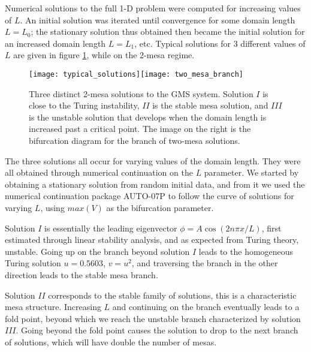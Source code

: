 
Numerical solutions to the full 1-D problem were computed for increasing values of $L$. An initial solution was iterated until convergence for some domain length $L=L_0$; the stationary solution thus obtained then became the initial solution for an increased domain length $L=L_1$, etc. Typical solutions for 3 different values of $L$ are given in figure \ref{fig:typical}, while on the 2-mesa regime. 
% 
\begin{figure}[htb]
\begin{center}
\texttt{[image: typical\_solutions]}\texttt{[image: two\_mesa\_branch]}

\caption{Three distinct 2-mesa solutions to the GMS system. Solution $I$ is close to the Turing instability, $II$ is the stable mesa solution, and $III$ is the unstable solution that develops when the domain length is increased past a critical point. The image on the right is the bifurcation diagram for the branch of two-mesa solutions.}
\label{fig:typical}
\end{center}
\end{figure}
% 
The three solutions all occur for varying values of the domain length. They were all obtained through numerical continuation on the $L$ parameter. We started by obtaining a stationary solution from random initial data, and from it we used the numerical continuation package AUTO-07P \cite{doedel_auto-07p} to follow the curve of solutions for varying $L$, using $max(V)$ as the bifurcation parameter. 

Solution $I$ is essentially the leading eigenvector $\phi = A\cos(2n\pi x/L)$, first estimated through linear stability analysis, and as expected from Turing theory, unstable. Going up on the branch beyond solution $I$ leads to the homogeneous Turing solution $u=0.5603$, $v=u^2$, and traversing the branch in the other direction leads to the stable mesa branch.

Solution $II$ corresponds to the stable family of solutions, this is a characteristic mesa structure. Increasing $L$ and continuing on the branch eventually leads to a fold point, beyond which we reach the unstable branch characterized by solution $III$. Going beyond the fold point causes the solution to drop to the next branch of solutions, which will have double the number of mesas.

